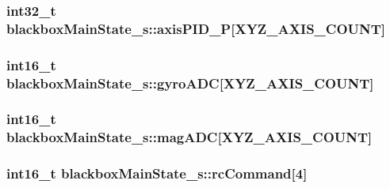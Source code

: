 \hypertarget{structblackboxMainState__s_aa4c1b0dda7b33c9a087a9c212e7bf0c6}{
\subsubsection[{axis\+P\+I\+D\+\_\+\+P}]{\setlength{\rightskip}{0pt plus 5cm}int32\+\_\+t blackbox\+Main\+State\+\_\+s\+::axis\+P\+I\+D\+\_\+\+P\mbox{[}{\bf X\+Y\+Z\+\_\+\+A\+X\+I\+S\+\_\+\+C\+O\+U\+N\+T}\mbox{]}}}\label{structblackboxMainState__s_aa4c1b0dda7b33c9a087a9c212e7bf0c6}
\hypertarget{structblackboxMainState__s_ac7d4fefd0c02080a31402d2477f2d2ac}{
\subsubsection[{gyro\+A\+D\+C}]{\setlength{\rightskip}{0pt plus 5cm}int16\+\_\+t blackbox\+Main\+State\+\_\+s\+::gyro\+A\+D\+C\mbox{[}{\bf X\+Y\+Z\+\_\+\+A\+X\+I\+S\+\_\+\+C\+O\+U\+N\+T}\mbox{]}}}\label{structblackboxMainState__s_ac7d4fefd0c02080a31402d2477f2d2ac}
\hypertarget{structblackboxMainState__s_a3296e9412f25fdb7af57238773b3e9db}{
\subsubsection[{mag\+A\+D\+C}]{\setlength{\rightskip}{0pt plus 5cm}int16\+\_\+t blackbox\+Main\+State\+\_\+s\+::mag\+A\+D\+C\mbox{[}{\bf X\+Y\+Z\+\_\+\+A\+X\+I\+S\+\_\+\+C\+O\+U\+N\+T}\mbox{]}}}\label{structblackboxMainState__s_a3296e9412f25fdb7af57238773b3e9db}
\hypertarget{structblackboxMainState__s_a762befb05a790eae4e12f91e15eaf1ab}{
\subsubsection[{rc\+Command}]{\setlength{\rightskip}{0pt plus 5cm}int16\+\_\+t blackbox\+Main\+State\+\_\+s\+::rc\+Command\mbox{[}4\mbox{]}}}\label{structblackboxMainState__s_a762befb05a790eae4e12f91e15eaf1ab}
